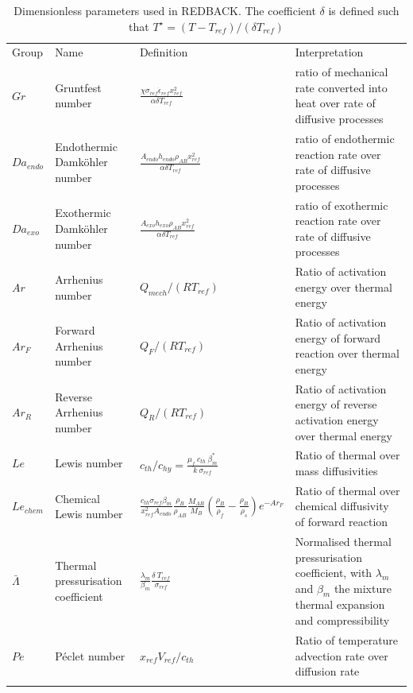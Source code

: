 \documentclass[]{scrreprt}
\newcommand{\redback}{{REDBACK}}
\begin{document}
\begin{table}
  \caption{Dimensionless parameters used in \redback{}. The coefficient $\delta$ is defined
such that $T^{\star} = (T-T_{ref})/(\delta T_{ref})$}
\label{tab:dimensionless_nbs}
\begin{tabular}{| L{1cm} | L{2.5cm} | L{6cm} | L{5cm} |}
\hline\noalign{\smallskip}
Group & Name & Definition & Interpretation \\
\noalign{\smallskip}\hline\noalign{\smallskip}
$Gr$ & Gruntfest number & $\frac{\chi\sigma_{ref}\dot{\epsilon}_{ref} x^2_{ref}}{\alpha \delta T_{ref}}$ & ratio of mechanical rate converted into heat over rate of diffusive processes \\
$Da_{endo}$ & Endothermic Damk\"{o}hler number & $\frac{A_{endo} h_{endo} \rho_{AB} x^2_{ref}}{\alpha \delta T_{ref}}$ & ratio of endothermic reaction rate over rate of diffusive processes \\
$Da_{exo}$ & Exothermic Damk\"{o}hler number & $\frac{A_{exo} h_{exo} \rho_{AB} x^2_{ref}}{\alpha \delta T_{ref}}$ & ratio of exothermic reaction rate over rate of diffusive processes \\
$Ar$ & Arrhenius number & $Q_{mech}/(R T_{ref})$ & Ratio of activation energy over thermal energy \\
$Ar_F$ & Forward Arrhenius number & $Q_F/(R T_{ref})$ & Ratio of activation energy of forward reaction over thermal energy \\
$Ar_R$ & Reverse Arrhenius number & $Q_R/(R T_{ref})$ & Ratio of activation energy of reverse activation energy over thermal energy \\
$Le$ & Lewis number & $c_{th}/c_{hy}=\frac{\mu_f\:c_{th}\:\beta^*_m}{k \: \sigma_{ref}}$ & Ratio of thermal over mass diffusivities \\
$Le_{chem}$ & Chemical Lewis number & $\frac{c_{th}\sigma_{ref}\beta_m }{x^2_{ref} A_{endo}}\frac{\rho_{B}}{\rho_{AB}} \frac{M_{AB}}{M_{B}} \left( \frac{\rho_B}{\rho_f} - \frac{\rho_B}{\rho_s}\right)e^{-Ar_F}$ & Ratio of thermal over chemical diffusivity of forward reaction \\
$\bar{\Lambda}$ & Thermal pressurisation coefficient & $\frac{\lambda_m}{\beta_m}\frac{\delta \:T_{ref}}{\sigma_{ref}}$ & Normalised thermal pressurisation coefficient, with $\lambda_m$ and $\beta_m$ the mixture thermal expansion and compressibility \\
$Pe$ & P\'{e}clet number & $x_{ref}V_{ref}/c_{th}$ & Ratio of temperature advection rate over diffusion rate \\
\noalign{\smallskip}\hline
\end{tabular}
\end{table}
\end{document}
